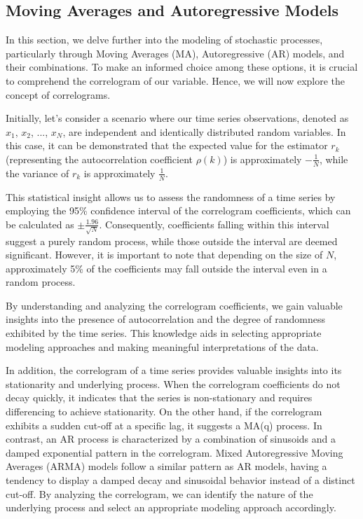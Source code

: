 \documentclass[../main.tex]{subfiles}
\begin{document}
    \subsection{Moving Averages and Autoregressive Models}
        In this section, we delve further into the modeling of stochastic processes, particularly through Moving Averages (MA), Autoregressive (AR) models, and their combinations. To make an informed choice among these options, it is crucial to comprehend the correlogram of our variable. Hence, we will now explore the concept of correlograms.\par

        Initially, let's consider a scenario where our time series observations, denoted as $x_1$, $x_2$, ..., $x_N$, are independent and identically distributed random variables. In this case, it can be demonstrated that the expected value for the estimator $r_k$ (representing the autocorrelation coefficient $\rho(k)$) is approximately $-\frac{1}{N}$, while the variance of $r_k$ is approximately $\frac{1}{N}$.\par
        
        This statistical insight allows us to assess the randomness of a time series by employing the 95\% confidence interval of the correlogram coefficients, which can be calculated as $\pm \frac{1.96}{\sqrt{N}}$. Consequently, coefficients falling within this interval suggest a purely random process, while those outside the interval are deemed significant. However, it is important to note that depending on the size of $N$, approximately 5\% of the coefficients may fall outside the interval even in a random process.\par
        
        By understanding and analyzing the correlogram coefficients, we gain valuable insights into the presence of autocorrelation and the degree of randomness exhibited by the time series. This knowledge aids in selecting appropriate modeling approaches and making meaningful interpretations of the data.\par

        In addition, the correlogram of a time series provides valuable insights into its stationarity and underlying process. When the correlogram coefficients do not decay quickly, it indicates that the series is non-stationary and requires differencing to achieve stationarity. On the other hand, if the correlogram exhibits a sudden cut-off at a specific lag, it suggests a MA(q) process. In contrast, an AR process is characterized by a combination of sinusoids and a damped exponential pattern in the correlogram. Mixed Autoregressive Moving Averages (ARMA) models follow a similar pattern as AR models, having a tendency to display a damped decay and sinusoidal behavior instead of a distinct cut-off. By analyzing the correlogram, we can identify the nature of the underlying process and select an appropriate modeling approach accordingly.\par
\end{document}
